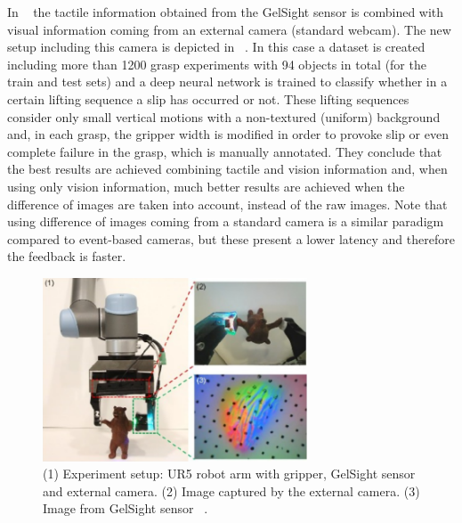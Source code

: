 In ~\cite{gelsight2018} the tactile information obtained from the GelSight sensor is combined with visual information coming from an external camera (standard webcam). The new setup including this camera is depicted in ~. In this case a dataset is created including more than 1200 grasp experiments with 94 objects in total (for the train and test sets) and a deep neural network is trained to classify whether in a certain lifting sequence a slip has occurred or not. These lifting sequences consider only small vertical motions with a non-textured (uniform) background and, in each grasp, the gripper width is modified in order to provoke slip or even complete failure in the grasp, which is manually annotated. They conclude that the best results are achieved combining tactile and vision information and, when using only vision information, much better results are achieved when the difference of images are taken into account, instead of the raw images. Note that using difference of images coming from a standard camera is a similar paradigm compared to event-based cameras, but these present a lower latency and therefore the feedback is faster.

\begin{figure}[h]
    \centering
    \includegraphics[width=0.7\textwidth]{resources/images/gelsight}
    \caption{(1) Experiment setup: UR5 robot arm with gripper, GelSight sensor and external camera. (2) Image captured by the external camera. (3) Image from GelSight sensor ~\cite{gelsight2018}.}\label{fig:gelsight}
\end{figure}

